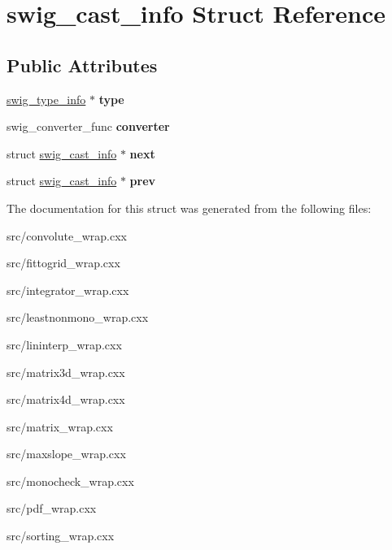 \hypertarget{structswig__cast__info}{
\section{swig\_\-cast\_\-info Struct Reference}
\label{d2/d87/structswig__cast__info}
}
\subsection*{Public Attributes}
\begin{DoxyCompactItemize}
\item 
\hypertarget{structswig__cast__info_a06b74832d16cc0c4fd147e4c39095cd9}{
\hyperlink{structswig__type__info}{swig\_\-type\_\-info} $\ast$ {\bfseries type}}
\label{d2/d87/structswig__cast__info_a06b74832d16cc0c4fd147e4c39095cd9}

\item 
\hypertarget{structswig__cast__info_aa630fddfbb1bf9c97a03f9479ba32f76}{
swig\_\-converter\_\-func {\bfseries converter}}
\label{d2/d87/structswig__cast__info_aa630fddfbb1bf9c97a03f9479ba32f76}

\item 
\hypertarget{structswig__cast__info_a2fc1b5702ec07bc23135df5c5db8e53e}{
struct \hyperlink{structswig__cast__info}{swig\_\-cast\_\-info} $\ast$ {\bfseries next}}
\label{d2/d87/structswig__cast__info_a2fc1b5702ec07bc23135df5c5db8e53e}

\item 
\hypertarget{structswig__cast__info_a0f5d1fc81b494c3e032a153609fd3268}{
struct \hyperlink{structswig__cast__info}{swig\_\-cast\_\-info} $\ast$ {\bfseries prev}}
\label{d2/d87/structswig__cast__info_a0f5d1fc81b494c3e032a153609fd3268}

\end{DoxyCompactItemize}


The documentation for this struct was generated from the following files:\begin{DoxyCompactItemize}
\item 
src/convolute\_\-wrap.cxx\item 
src/fittogrid\_\-wrap.cxx\item 
src/integrator\_\-wrap.cxx\item 
src/leastnonmono\_\-wrap.cxx\item 
src/lininterp\_\-wrap.cxx\item 
src/matrix3d\_\-wrap.cxx\item 
src/matrix4d\_\-wrap.cxx\item 
src/matrix\_\-wrap.cxx\item 
src/maxslope\_\-wrap.cxx\item 
src/monocheck\_\-wrap.cxx\item 
src/pdf\_\-wrap.cxx\item 
src/sorting\_\-wrap.cxx\end{DoxyCompactItemize}
